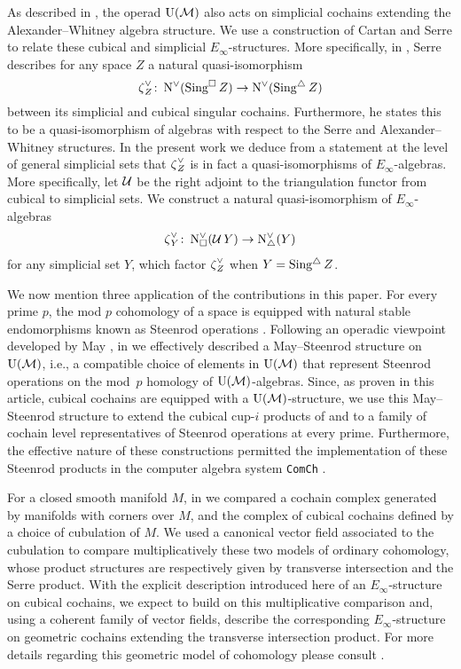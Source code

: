 As described in \cite{medina2020prop1}, the operad ${\operatorname{U}(\mathcal{M})}$ also acts on simplicial cochains extending the Alexander--Whitney algebra structure.
We use a construction of Cartan and Serre to relate these cubical and simplicial $E_\infty$-structures.
More specifically, in \cite[p. 442]{serre1951homologie}, Serre describes for any space $Z$ a natural quasi-isomorphism
\[
\operatorname{\zeta}_Z^\vee \colon \operatorname{N^{\vee}}(\operatorname{Sing^{\square}} Z) \to \operatorname{N^{\vee}}(\operatorname{Sing^{\triangle}} Z)
\]
between its simplicial and cubical singular cochains.
Furthermore, he states this to be a quasi-isomorphism of algebras with respect to the Serre and Alexander--Whitney structures.
In the present work we deduce from a statement at the level of general simplicial sets that $\operatorname{\zeta}_Z^\vee$ is in fact a quasi-isomorphisms of $E_\infty$-algebras.
More specifically, let $\operatorname{\mathcal{U}}$ be the right adjoint to the triangulation functor from cubical to simplicial sets.
We construct a natural quasi-isomorphism of $E_\infty$-algebras
\[
\operatorname{\zeta}_Y^\vee \colon \operatorname{N^{\vee}_{\square}}(\operatorname{\mathcal{U}} Y) \to \operatorname{N^{\vee}_{\triangle}}(Y)
\]
for any simplicial set $Y$, which factor $\operatorname{\zeta}_Z^\vee$ when $Y = \operatorname{Sing^{\triangle}} Z$.

We now mention three application of the contributions in this paper.
For every prime $p$, the mod $p$ cohomology of a space is equipped with natural stable endomorphisms known as Steenrod operations \cite{steenrod1962cohomology}.
Following an operadic viewpoint developed by May \cite{may1970general}, in \cite{medina2020maysteenrod} we effectively described a May--Steenrod structure on ${\operatorname{U}(\mathcal{M})}$, i.e., a compatible choice of elements in ${\operatorname{U}(\mathcal{M})}$ that represent Steenrod operations on the mod~$p$ homology of ${\operatorname{U}(\mathcal{M})}$-algebras.
Since, as proven in this article, cubical cochains are equipped with a ${\operatorname{U}(\mathcal{M})}$-structure, we use this May--Steenrod structure to extend the cubical cup-$i$ products of \cite{kadeishvili2003cupi} and \cite{pilarczyk2016cubical} to a family of cochain level representatives of Steenrod operations at every prime.
Furthermore, the effective nature of these constructions permitted the implementation of these Steenrod products in the computer algebra system \texttt{ComCh} \cite{medina2021computer}.

For a closed smooth manifold $M$, in \cite{medina2021flowing} we compared a cochain complex generated by manifolds with corners over $M$, and the complex of cubical cochains defined by a choice of cubulation of $M$.
We used a canonical vector field associated to the cubulation to compare multiplicatively these two models of ordinary cohomology, whose product structures are respectively given by transverse intersection and the Serre product.
With the explicit description introduced here of an $E_\infty$-structure on cubical cochains, we expect to build on this multiplicative comparison and, using a coherent family of vector fields, describe the corresponding $E_\infty$-structure on geometric cochains extending the transverse intersection product.
For more details regarding this geometric model of cohomology please consult \cite{medina2021foundations}.

